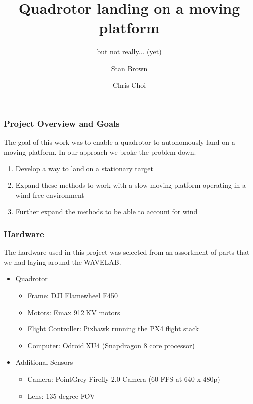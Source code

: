\documentclass{beamer}
\begin{document}
\title{Quadrotor landing on a moving platform}
\subtitle{but not really... (yet)}
\author[]{Stan Brown \and Chris Choi}

\frame{\titlepage}
   \begin{frame}
    \frametitle{Project Overview and Goals}
     The goal of this work was to enable a quadrotor to autonomously land on a moving platform. In our approach we broke the problem down.
     \begin{enumerate}
        \item Develop a way to land on a stationary target
        \item Expand these methods to work with a slow moving platform operating in a wind free environment
        \item Further expand the methods to be able to account for wind
    \end{enumerate}     
\end{frame}

 \begin{frame}
    \frametitle{Hardware}
     The hardware used in this project was selected from an assortment of parts that we had laying around the WAVELAB. 
     \begin{itemize}    
        \item Quadrotor
        	\begin{itemize}
        		\item Frame: DJI Flamewheel F450
        		\item Motors: Emax 912 KV motors
        		\item Flight Controller: Pixhawk running the PX4 flight stack
        		\item Computer: Odroid XU4 (Snapdragon 8 core processor)
        	\end{itemize}
        	
        	\item Additional Sensors
        	\begin{itemize}
        		\item Camera: PointGrey Firefly 2.0 Camera (60 FPS at 640 x 480p)
        		\item Lens: 135 degree FOV
        	\end{itemize}
    \end{itemize}     
\end{frame}
\end{document}
